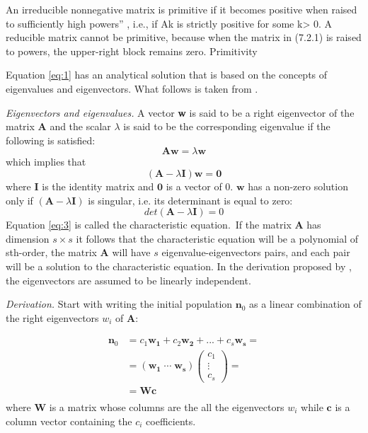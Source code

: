 \documentclass[\main/main.tex]{subfiles}
\begin{document}
An irreducible nonnegative matrix is primitive if it becomes positive when raised to sufficiently high powers'' \citep{Keyfitz2005}, i.e., if Ak is strictly positive for some k> 0. A reducible matrix cannot be primitive, because when the matrix in (7.2.1) is raised to powers, the upper-right block remains zero. Primitivity



Equation \ref{eq:1} has an analytical solution that is based on the concepts of eigenvalues and eigenvectors. What follows is taken from \cite{Keyfitz2005}.

\noindent \textit{Eigenvectors and eigenvalues.} A vector \textbf{w} is said to be a right eigenvector of the matrix \textbf{A} and the scalar $\lambda$ is said to be the corresponding eigenvalue if the following is satisfied:
\begin{equation} \label{eq:2}
    \mathbf{Aw} = \lambda \mathbf{w}
\end{equation}
which implies that
\begin{equation} \label{eq:2}
    (\mathbf{A} - \lambda \mathbf{I}) \mathbf{w} =\mathbf{0} 
\end{equation}
where $\mathbf{I}$ is the identity matrix and $\mathbf{0} $ is a vector of 0. 
$\mathbf{w}$ has a non-zero solution only if $(\mathbf{A} - \lambda \mathbf{I})$ is singular, i.e. its determinant is equal to zero:
\begin{equation}\label{eq:3}
    det (\mathbf{A} - \lambda \mathbf{I}) = 0
\end{equation}
Equation \ref{eq:3} is called the characteristic equation.\
If the matrix $\mathbf{A}$ has dimension $s \times s$ it follows that the characteristic equation will be a polynomial of sth-order, the matrix $\mathbf{A}$ will have $s$ eigenvalue-eigenvectors pairs, and each pair will be a solution to the characteristic equation. In the derivation proposed by \cite{Keyfitz2005}, the eigenvectors are assumed to be linearly independent.

\noindent \textit{Derivation.} Start with writing the initial population $\mathbf{n}_0$ as a linear combination of the right eigenvectors $w_i$ of $\mathbf{A}$:

\begin{equation}
\begin{split}
    \mathbf{n}_0 &= c_1 \mathbf{w_1} + c_2 \mathbf{w_2} + ... + c_s \mathbf{w_s} = \\
    &= (\mathbf{w_1} \; \cdots \; \mathbf{w_s})
\begin{pmatrix}
c_1 \\ \vdots \\c_s
\end{pmatrix}  =\\
&= \mathbf{Wc}\\
\end{split}
\end{equation}
where $\mathbf{W}$ is a matrix whose columns are the all the eigenvectors $w_i$ while $ \mathbf{c}$ is a column vector containing the $c_i$ coefficients.
\end{document}

